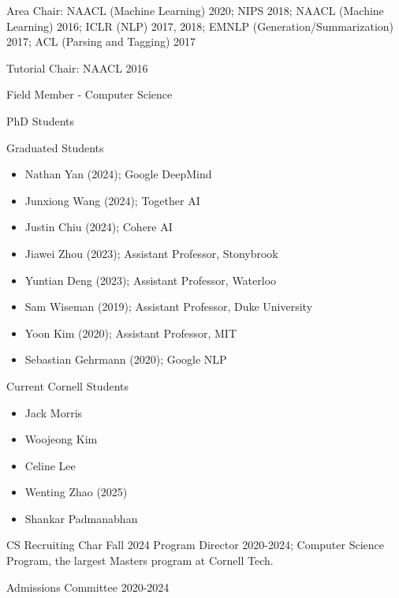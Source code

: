 \documentclass[10pt]{article}
\begin{document}
\ind Area Chair:
\ind NAACL (Machine Learning) 2020; NIPS 2018; NAACL (Machine Learning) 2016; ICLR (NLP) 2017, 2018; EMNLP (Generation/Summarization) 2017; ACL (Parsing and Tagging) 2017

\ind Tutorial Chair: NAACL 2016

\bigskip

\medskip

\ind Field Member - Computer Science

\ind PhD Students


\ind Graduated Students

\begin{itemize}
	\item Nathan Yan (2024); Google DeepMind
	\item Junxiong Wang (2024); Together AI
	\item Justin Chiu (2024); Cohere AI
	\item Jiawei Zhou (2023); Assistant Professor, Stonybrook
	\item Yuntian Deng (2023); Assistant Professor, Waterloo
	\item Sam Wiseman (2019); Assistant Professor, Duke University
	\item Yoon Kim (2020); Assistant Professor, MIT
	\item Sebastian Gehrmann (2020); Google NLP

\end{itemize}


\ind Current Cornell Students

\begin{itemize}
	\item Jack Morris
	\item Woojeong Kim
	\item Celine Lee
	\item Wenting Zhao (2025)
	\item Shankar Padmanabhan
\end{itemize}


\medskip
\ind CS Recruiting Char Fall 2024
\ind Program Director 2020-2024; Computer Science Program, the largest Masters program at Cornell Tech.

\ind Admissions Committee 2020-2024
\bigskip


\end{document}
